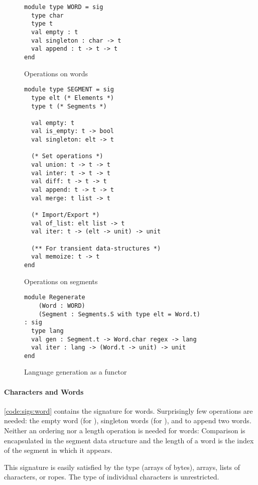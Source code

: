 \begin{figure}[tp]
  \centering
\begin{lstlisting}
module type WORD = sig
  type char
  type t
  val empty : t
  val singleton : char -> t
  val append : t -> t -> t
end
\end{lstlisting}
    \caption{Operations on words}
    \label{code:sigs:word}

\begin{lstlisting}
module type SEGMENT = sig
  type elt (* Elements *)
  type t (* Segments *)

  val empty: t
  val is_empty: t -> bool
  val singleton: elt -> t

  (* Set operations *)
  val union: t -> t -> t
  val inter: t -> t -> t
  val diff: t -> t -> t
  val append: t -> t -> t
  val merge: t list -> t

  (* Import/Export *)
  val of_list: elt list -> t
  val iter: t -> (elt -> unit) -> unit

  (** For transient data-structures *)
  val memoize: t -> t
end
\end{lstlisting}
    \caption{Operations on segments}
    \label{code:sigs:segment}
    
\begin{lstlisting}
module Regenerate
    (Word : WORD)
    (Segment : Segments.S with type elt = Word.t)
: sig
  type lang
  val gen : Segment.t -> Word.char regex -> lang
  val iter : lang -> (Word.t -> unit) -> unit
end
\end{lstlisting}
    \caption{Language generation as a functor}
    \label{code:sigs:regen}
\end{figure}

\paragraph{Characters and Words}

\autoref{code:sigs:word} contains the signature for words.
Surprisingly few operations are needed:
the empty word (for ),
singleton words (for ), and to append two words.
Neither an ordering nor a length operation is needed for words:
Comparison is encapsulated in the segment
data structure and the length of a word is the index of the segment in
which it appears.

This signature is easily satisfied by the \ocaml {}
type (\ie arrays of bytes), arrays, lists of characters, or ropes. The
type of individual characters is unrestricted.


